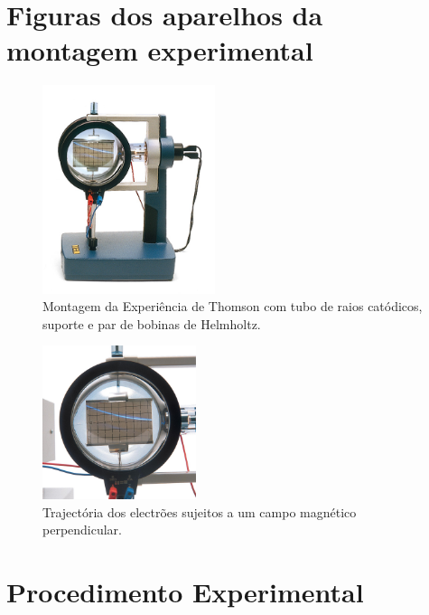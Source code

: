 \documentclass[a4paper,twoside,11pt]{report}      %
\begin{document}
\newpage
\section{\sf Figuras dos aparelhos da montagem experimental}
\begin{figure}[ht]
	\centering 
	\includegraphics[width=0.45\textwidth]{./fig3-ThomsomEquip}
	\caption{Montagem da Experiência de Thomson com tubo de raios catódicos, suporte e par de bobinas de Helmholtz. \label{fig:Thomson_Equip}} 
\end{figure}

\begin{figure}[hb]
	\centering 
	\includegraphics[width=0.4\textwidth]{./fig4-Thomson_Electron-Deflection-Tube-D}
	\caption{Trajectória dos electrões sujeitos a um campo magnético perpendicular. \label{fig:Thomson_trajec}} 
\end{figure}



\newpage

\section{\sf Procedimento Experimental}
\end{document}
